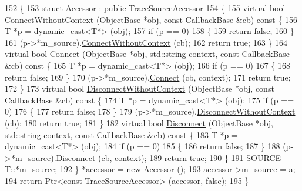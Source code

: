 \begin{DoxyCode}
152 \{
153   \textcolor{keyword}{struct }Accessor : \textcolor{keyword}{public} TraceSourceAccessor
154   \{
155     \textcolor{keyword}{virtual} \textcolor{keywordtype}{bool} \hyperlink{group__config_gaa2f896aa7021f95fffabc80b2ec22e08}{ConnectWithoutContext} (ObjectBase *obj, \textcolor{keyword}{const} CallbackBase &cb)\textcolor{keyword}{ const
       }\{
156       T *\hyperlink{lte__link__budget_8m_ac9de518908a968428863f829398a4e62}{p} = \textcolor{keyword}{dynamic\_cast<}T*\textcolor{keyword}{>} (obj);
157       \textcolor{keywordflow}{if} (p == 0)
158         \{
159           \textcolor{keywordflow}{return} \textcolor{keyword}{false};
160         \}
161       (p->*m\_source).\hyperlink{group__config_gaa2f896aa7021f95fffabc80b2ec22e08}{ConnectWithoutContext} (cb);
162       \textcolor{keywordflow}{return} \textcolor{keyword}{true};
163     \}
164     \textcolor{keyword}{virtual} \textcolor{keywordtype}{bool} \hyperlink{group__config_ga4014f151241cd0939b6cb64409605736}{Connect} (ObjectBase *obj, std::string context, \textcolor{keyword}{const} CallbackBase &cb)\textcolor{keyword}{ const }\{
165       T *p = \textcolor{keyword}{dynamic\_cast<}T*\textcolor{keyword}{>} (obj);
166       \textcolor{keywordflow}{if} (p == 0)
167         \{
168           \textcolor{keywordflow}{return} \textcolor{keyword}{false};
169         \}
170       (p->*m\_source).\hyperlink{group__config_ga4014f151241cd0939b6cb64409605736}{Connect} (cb, context);
171       \textcolor{keywordflow}{return} \textcolor{keyword}{true};
172     \}
173     \textcolor{keyword}{virtual} \textcolor{keywordtype}{bool} \hyperlink{group__config_ga9979e293cae542020fada4824d0b3702}{DisconnectWithoutContext} (ObjectBase *obj, \textcolor{keyword}{const} CallbackBase &cb)\textcolor{keyword}{
       const }\{
174       T *p = \textcolor{keyword}{dynamic\_cast<}T*\textcolor{keyword}{>} (obj);
175       \textcolor{keywordflow}{if} (p == 0)
176         \{
177           \textcolor{keywordflow}{return} \textcolor{keyword}{false};
178         \}
179       (p->*m\_source).\hyperlink{group__config_ga9979e293cae542020fada4824d0b3702}{DisconnectWithoutContext} (cb);
180       \textcolor{keywordflow}{return} \textcolor{keyword}{true};
181     \}
182     \textcolor{keyword}{virtual} \textcolor{keywordtype}{bool} \hyperlink{group__config_ga33e975bd2ed84e3353b2a3356d90fc1d}{Disconnect} (ObjectBase *obj, std::string context, \textcolor{keyword}{const} CallbackBase &cb)\textcolor{keyword}{ const }
      \{
183       T *p = \textcolor{keyword}{dynamic\_cast<}T*\textcolor{keyword}{>} (obj);
184       \textcolor{keywordflow}{if} (p == 0)
185         \{
186           \textcolor{keywordflow}{return} \textcolor{keyword}{false};
187         \}
188       (p->*m\_source).\hyperlink{group__config_ga33e975bd2ed84e3353b2a3356d90fc1d}{Disconnect} (cb, context);
189       \textcolor{keywordflow}{return} \textcolor{keyword}{true};
190     \}
191     SOURCE T::*m\_source;
192   \} *accessor = \textcolor{keyword}{new} Accessor ();
193   accessor->m\_source = a;
194   \textcolor{keywordflow}{return} Ptr<const TraceSourceAccessor> (accessor, \textcolor{keyword}{false});
195 \}
\end{DoxyCode}



